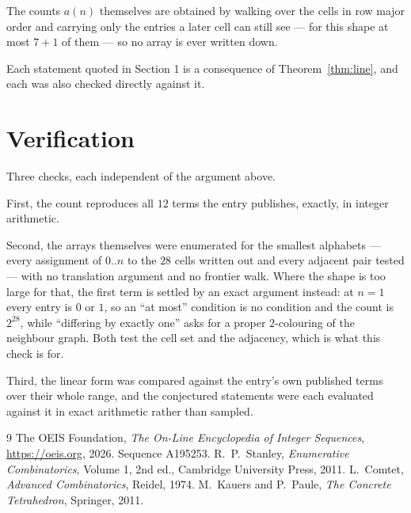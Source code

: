 \documentclass[11pt,a4paper]{article}
\theoremstyle{plain}
\theoremstyle{definition}
\begin{document}
The counts $a(n)$ themselves are obtained by walking over the cells in row major order and
carrying only the entries a later cell can still see --- for this shape at most $7+1$ of
them --- so no array is ever written down.

Each statement quoted in Section 1 is a consequence of Theorem~\ref{thm:line}, and each was
also checked directly against it.

\section{Verification}

Three checks, each independent of the argument above.

First, the count reproduces all $12$ terms the entry publishes, exactly, in integer
arithmetic.

Second, the arrays themselves were enumerated for the smallest alphabets --- every assignment
of $0..n$ to the $28$ cells written out and every adjacent pair tested --- with no
translation argument and no frontier walk. Where the shape is too large for that, the first
term is settled by an exact argument instead: at $n=1$ every entry is $0$ or $1$, so an ``at
most'' condition is no condition and the count is $2^{28}$, while ``differing by exactly
one'' asks for a proper $2$-colouring of the neighbour graph. Both test the cell set and the
adjacency, which is what this check is for.

Third, the linear form was compared against the entry's own published terms over their whole
range, and the conjectured statements were each evaluated against it in exact arithmetic
rather than sampled.

\begin{thebibliography}{9}
 The OEIS Foundation, \emph{The On-Line Encyclopedia of Integer
Sequences}, \url{https://oeis.org}, 2026. Sequence A195253.
 R.~P.~Stanley, \emph{Enumerative Combinatorics}, Volume 1, 2nd ed.,
Cambridge University Press, 2011.
 L.~Comtet, \emph{Advanced Combinatorics}, Reidel, 1974.
 M.~Kauers and P.~Paule, \emph{The Concrete Tetrahedron}, Springer, 2011.
\end{thebibliography}
\end{document}
